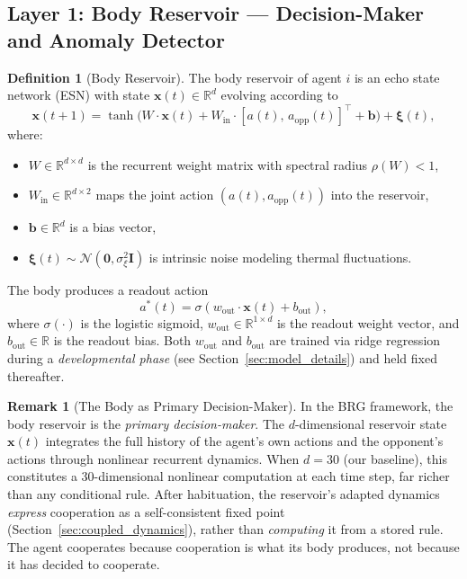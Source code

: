 \documentclass[11pt,a4paper]{article}
\theoremstyle{definition}
\newtheorem{definition}[theorem]{Definition}
\newtheorem{remark}[theorem]{Remark}
\newcommand{\R}{\mathbb{R}}
\newcommand{\Wres}{W}
\newcommand{\Wout}{w_{\mathrm{out}}}
\newcommand{\Win}{W_{\mathrm{in}}}
\newcommand{\xstate}{\mathbf{x}}
\newcommand{\abody}{a^{*}}
\newcommand{\bout}{b_{\mathrm{out}}}
\begin{document}
\subsection{Layer 1: Body Reservoir --- Decision-Maker and Anomaly Detector}

\begin{definition}[Body Reservoir]
\label{def:body_reservoir}
The body reservoir of agent $i$ is an echo state network (ESN)
\citep{jaeger2001} with state $\xstate(t) \in \R^d$ evolving according to
\begin{equation}
\label{eq:reservoir}
\xstate(t+1) = \tanh\bigl(\Wres \cdot \xstate(t) + \Win \cdot
  [a(t),\, a_{\mathrm{opp}}(t)]^{\top} + \mathbf{b}\bigr) + \boldsymbol{\xi}(t),
\end{equation}
where:
\begin{itemize}[nosep]
  \item $\Wres \in \R^{d \times d}$ is the recurrent weight matrix with
    spectral radius $\rho(\Wres) < 1$,
  \item $\Win \in \R^{d \times 2}$ maps the joint action
    $(a(t), a_{\mathrm{opp}}(t))$ into the reservoir,
  \item $\mathbf{b} \in \R^d$ is a bias vector,
  \item $\boldsymbol{\xi}(t) \sim \mathcal{N}(\mathbf{0}, \sigma_{\xi}^2 \mathbf{I})$
    is intrinsic noise modeling thermal fluctuations.
\end{itemize}
The body produces a readout action
\begin{equation}
\label{eq:readout}
\abody(t) = \sigma(\Wout \cdot \xstate(t) + \bout),
\end{equation}
where $\sigma(\cdot)$ is the logistic sigmoid, $\Wout \in \R^{1 \times d}$
is the readout weight vector, and $\bout \in \R$ is the readout bias.
Both $\Wout$ and $\bout$ are trained via ridge regression during a
\emph{developmental phase} (see Section~\ref{sec:model_details}) and held
fixed thereafter.
\end{definition}

\begin{remark}[The Body as Primary Decision-Maker]
In the BRG framework, the body reservoir is the \emph{primary decision-maker}.
The $d$-dimensional reservoir state $\xstate(t)$ integrates the full history
of the agent's own actions and the opponent's actions through nonlinear
recurrent dynamics.  When $d = 30$ (our baseline), this constitutes a
$30$-dimensional nonlinear computation at each time step, far richer than
any conditional rule.  After habituation, the reservoir's adapted
dynamics \emph{express} cooperation as a self-consistent fixed point
(Section~\ref{sec:coupled_dynamics}), rather than \emph{computing} it
from a stored rule.  The agent cooperates because cooperation is what its
body produces, not because it has decided to cooperate.
\end{remark}
\end{document}
